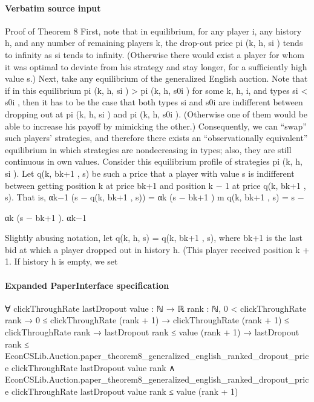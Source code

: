 \documentclass[10pt]{article}
\begin{document}
\paragraph{Verbatim source input}
\begin{ReviewVerbatim}
Proof of Theorem 8
First, note that in equilibrium, for any player i, any history h, and any number of remaining players
k, the drop-out price pi (k, h, si ) tends to infinity as si tends to infinity. (Otherwise there would
exist a player for whom it was optimal to deviate from his strategy and stay longer, for a sufficiently
high value s.) Next, take any equilibrium of the generalized English auction. Note that if in this
equilibrium pi (k, h, si ) > pi (k, h, s0i ) for some k, h, i, and types si < s0i , then it has to be the
case that both types si and s0i are indifferent between dropping out at pi (k, h, si ) and pi (k, h, s0i ).
(Otherwise one of them would be able to increase his payoff by mimicking the other.) Consequently,
we can “swap” such players’ strategies, and therefore there exists an “observationally equivalent”
equilibrium in which strategies are nondecreasing in types; also, they are still continuous in own
values. Consider this equilibrium profile of strategies pi (k, h, si ).
Let q(k, bk+1 , s) be such a price that a player with value s is indifferent between getting position
k at price bk+1 and position k − 1 at price q(k, bk+1 , s). That is,
αk−1 (s − q(k, bk+1 , s)) = αk (s − bk+1 )
m
q(k, bk+1 , s) = s −

αk
(s − bk+1 ).
αk−1

Slightly abusing notation, let q(k, h, s) = q(k, bk+1 , s), where bk+1 is the last bid at which a player
dropped out in history h. (This player received position k + 1. If history h is empty, we set
\end{ReviewVerbatim}


\paragraph{Expanded PaperInterface specification}
\begin{ReviewVerbatim}
∀ {clickThroughRate lastDropout value : ℕ → ℝ} {rank : ℕ},
  0 < clickThroughRate rank →
    0 ≤ clickThroughRate (rank + 1) →
      clickThroughRate (rank + 1) ≤ clickThroughRate rank →
        lastDropout rank ≤ value (rank + 1) →
          lastDropout rank ≤
              EconCSLib.Auction.paper_theorem8_generalized_english_ranked_dropout_price clickThroughRate lastDropout
                value rank ∧
            EconCSLib.Auction.paper_theorem8_generalized_english_ranked_dropout_price clickThroughRate lastDropout value
                rank ≤
              value (rank + 1)
\end{ReviewVerbatim}
\end{document}
